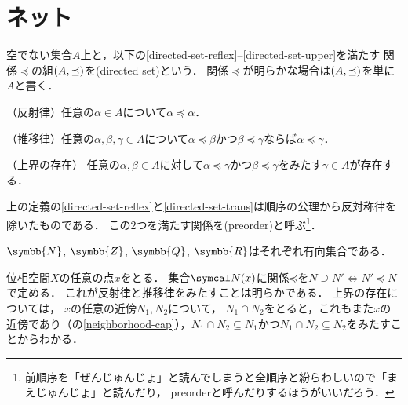 \documentclass{ltjsbook}
\begin{document}
\section{ネット}
\begin{thmbox}
\begin{definition}
空でない集合\(A\)上と，以下の\ref{directed-set-reflex}--\ref{directed-set-upper}を満たす
関係\(\preceq\)の組\((A, \preceq)\)を(directed set)という．
関係\(\preceq\)が明らかな場合は\((A, \preceq)\)を単に\(A\)と書く．
\begin{conditions}
    \item\label{directed-set-reflex} （反射律）任意の\(\alpha \in A\)について\(\alpha \preceq \alpha\)．
    \item\label{directed-set-trans} （推移律）任意の\(\alpha, \beta, \gamma \in A\)について\(\alpha \preceq \beta\)かつ\(\beta \preceq \gamma\)ならば\(\alpha \preceq \gamma\)．
    \item\label{directed-set-upper} （上界の存在） 任意の\(\alpha, \beta \in A\)に対して\(\alpha \preceq \gamma\)かつ\(\beta \preceq \gamma\)をみたす\(\gamma \in A\)が存在する．
\end{conditions}
\end{definition}
\end{thmbox}

上の定義の\ref{directed-set-reflex}と\ref{directed-set-trans}は順序の公理から反対称律を除いたものである．
この\(2\)つを満たす関係を(preorder)と呼ぶ\footnote{%
前順序を「ぜんじゅんじょ」と読んでしまうと全順序と紛らわしいので「まえじゅんじょ」と読んだり，
preorderと呼んだりするほうがいいだろう．}．

\begin{exa} \(\symbb{N}\), \(\symbb{Z}\), \(\symbb{Q}\), \(\symbb{R}\)はそれぞれ有向集合である．
\end{exa}

\begin{exa} 位相空間\(X\)の任意の点\(x\)をとる．
集合\(\Neighborhood{x}\)に関係\(\mathord{\preceq}\)を\(N \supseteq N' \Leftrightarrow N' \preceq N\)で定める．
これが反射律と推移律をみたすことは明らかである．
上界の存在については，
\(x\)の任意の近傍\(N_1, N_2\)について，
\(N_1 \cap N_2\)をとると，これもまた\(x\)の近傍であり（の\ref{neighborhood-cap}），\(N_1 \cap N_2 \subseteq N_1\)かつ\(N_1 \cap N_2 \subseteq N_2\)をみたすことからわかる．
\end{exa}
\end{document}
